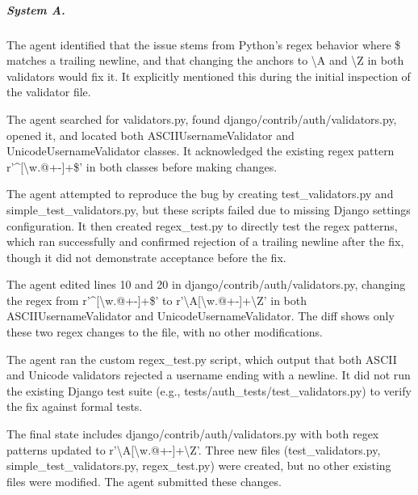 \subparagraph{System A.}
\begin{description}[itemsep=1pt, topsep=2pt]\small
\item[understanding] The agent identified that the issue stems from Python's regex behavior where \$ matches a trailing newline, and that changing the anchors to \textbackslash{}A and \textbackslash{}Z in both validators would fix it. It explicitly mentioned this during the initial inspection of the validator file.
\item[localization] The agent searched for validators.py, found django/contrib/auth/validators.py, opened it, and located both ASCIIUsernameValidator and UnicodeUsernameValidator classes. It acknowledged the existing regex pattern r'\textasciicircum{}[\textbackslash{}w.@+-]+\$' in both classes before making changes.
\item[reproduction] The agent attempted to reproduce the bug by creating test\_validators.py and simple\_test\_validators.py, but these scripts failed due to missing Django settings configuration. It then created regex\_test.py to directly test the regex patterns, which ran successfully and confirmed rejection of a trailing newline after the fix, though it did not demonstrate acceptance before the fix.
\item[editing] The agent edited lines 10 and 20 in django/contrib/auth/validators.py, changing the regex from r'\textasciicircum{}[\textbackslash{}w.@+-]+\$' to r'\textbackslash{}A[\textbackslash{}w.@+-]+\textbackslash{}Z' in both ASCIIUsernameValidator and UnicodeUsernameValidator. The diff shows only these two regex changes to the file, with no other modifications.
\item[verification] The agent ran the custom regex\_test.py script, which output that both ASCII and Unicode validators rejected a username ending with a newline. It did not run the existing Django test suite (e.g., tests/auth\_tests/test\_validators.py) to verify the fix against formal tests.
\item[final state] The final state includes django/contrib/auth/validators.py with both regex patterns updated to r'\textbackslash{}A[\textbackslash{}w.@+-]+\textbackslash{}Z'. Three new files (test\_validators.py, simple\_test\_validators.py, regex\_test.py) were created, but no other existing files were modified. The agent submitted these changes.
\end{description}

